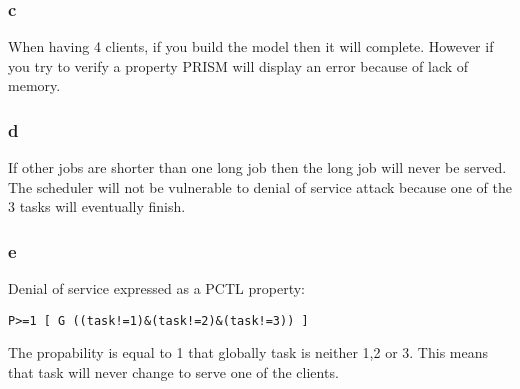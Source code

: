 \subsubsection{c}

When having 4 clients, if you build the model then it will complete. However if you try to verify a property PRISM will display an error because of lack of memory.

\subsubsection{d}

If other jobs are shorter than one long job then the long job will never be served. The scheduler will not be vulnerable to denial of service attack because one of the 3 tasks will eventually finish.

\subsubsection{e}
Denial of service expressed as a PCTL property:
\begin{verbatim}
P>=1 [ G ((task!=1)&(task!=2)&(task!=3)) ]
\end{verbatim}
The propability is equal to 1 that globally task is neither 1,2 or 3. This means that task will never change to serve one of the clients.